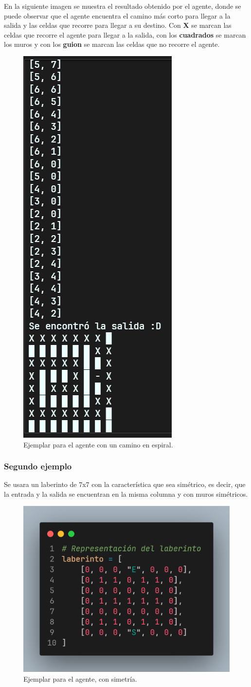 En la siguiente imagen se muestra el resultado obtenido por el agente, donde se puede observar 
que el agente encuentra el camino más corto para llegar a la salida y las celdas que recorre 
para llegar a su destino. Con \textbf{X} se marcan las celdas que recorre el agente para llegar 
a la salida, con los \textbf{cuadrados} se marcan los muros y con los \textbf{guion} se marcan 
las celdas que no recorre el agente.

\begin{figure}[H]
    \centering
    \includegraphics[width=0.2\linewidth]{IMA/RLaberinto1.png} 
    \caption{Ejemplar para el agente con un camino en espiral.} 
    \label{fig:ejemplo} 
\end{figure}


\subsubsection*{Segundo ejemplo}

Se usara un laberinto de 7x7 con la característica que sea simétrico,
es decir, que la entrada y la salida se encuentran en la misma columna y con muros simétricos.

\begin{figure}[H]
    \centering
    \includegraphics[width=0.4\linewidth]{IMA/Laberinto2.png} 
    \caption{Ejemplar para el agente, con simetría.} 
    \label{fig:ejemplo} 
\end{figure}


